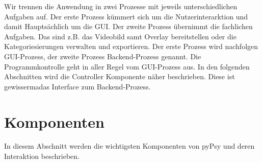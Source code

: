 \documentclass[a4paper,draft]{scrartcl}
\begin{document}
Wir trennen die Anwendung in zwei Prozesse mit jeweils unterschiedlichen Aufgaben auf.
Der erste Prozess k\"ummert sich um die Nutzerinterarktion und damit Haupts\"achlich um die GUI.
Der zweite Prozess \"ubernimmt die fachlichen Aufgaben. Das sind z.B. das Videobild samt Overlay bereitstellen oder die Kategoriesierungen verwalten und exportieren.
Der erste Prozess wird nachfolgen GUI-Prozess, der zweite Prozess Backend-Prozess genannt.
Die Programmkontrolle geht in aller Regel vom GUI-Prozess aus.
In den folgenden Abschnitten wird die Controller Komponente n\"aher beschrieben.
Diese ist gewisserma\ssen das Interface zum Backend-Prozess.

\section{Komponenten}
In diesem Abschnitt werden die wichtigsten Komponenten von pyPsy und deren Interaktion beschrieben. 
\end{document}
